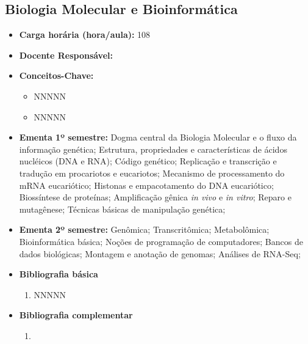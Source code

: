 \documentclass[11pt,fleqn]{book} %
\begin{document}
\newpage
\subsection{Biologia Molecular e Bioinformática}\label{disc:biomol}
\begin{itemize}
	\item \textbf{Carga horária (hora/aula):} 108
	\item \textbf{Docente Responsável:}
	\item \textbf{Conceitos-Chave:}
	\begin{itemize}
		\item NNNNN
		\item NNNNN
	\end{itemize}

	\item \textbf{Ementa 1º semestre:}
    Dogma central da Biologia Molecular e o fluxo da informação genética;
	Estrutura, propriedades e características de ácidos nucléicos (DNA e RNA);
	Código genético; 
	Replicação e transcrição e tradução em procariotos e eucariotos;
	Mecanismo de processamento do mRNA eucariótico; 
	Histonas e empacotamento do DNA eucariótico; 
	Biossíntese de proteínas; 
	Amplificação gênica \textit{in vivo} e \textit{in vitro}; 
	Reparo e mutagênese;
	Técnicas básicas de manipulação genética;
	
	\item \textbf{Ementa 2º semestre:}	
	Genômica;
	Transcritômica;
	Metabolômica;
	Bioinformática básica;
	Noções de programação de computadores;
	Bancos de dados biológicas;
	Montagem e anotação de genomas;
	Análises de RNA-Seq;	
	\item \textbf{Bibliografia básica}
	\begin{enumerate}
		\item NNNNN
	\end{enumerate}
	\item \textbf{Bibliografia complementar}
	\begin{enumerate}
		\item 
	\end{enumerate}	
\end{itemize}
\end{document}
